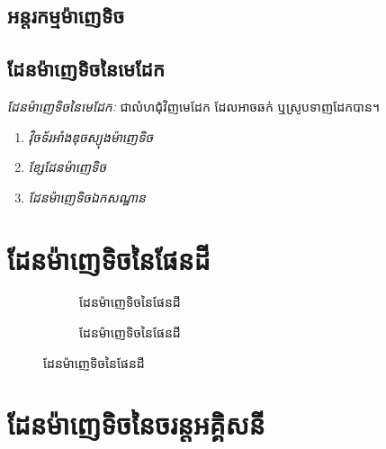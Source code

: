 \subsection{អន្តរកម្មម៉ាញេទិច}
\subsection{ដែនម៉ាញេទិចនៃមេដែក}
\begin{definition}
	\emph{\kml ដែនម៉ាញេទិចនៃមេដែកៈ} ជាលំហជុំវិញមេដែក ដែលអាចឆក់ ឬស្រូបទាញដែកបាន។
\end{definition}
\begin{enumerate}[k]
	\item \emph{\kml វ៉ិចទ័រអាំងឌុចស្យុងម៉ាញេទិច}
	\item \emph{\kml ខ្សែដែនម៉ាញេទិច}
	\item \emph{\kml ដែនម៉ាញេទិចឯកសណ្ឋាន}
\end{enumerate}
\section{ដែនម៉ាញេទិចនៃផែនដី}
\begin{figure}[H]
	\begin{subfigure}{.5\textwidth}
		\centering
		\caption{ដែនម៉ាញេទិចនៃផែនដី}
	\end{subfigure}
	\begin{subfigure}{.5\textwidth}
		\centering
		\caption{ដែនម៉ាញេទិចនៃផែនដី}
	\end{subfigure}
\end{figure}
\section{ដែនម៉ាញេទិចនៃចរន្តអគ្គិសនី}
